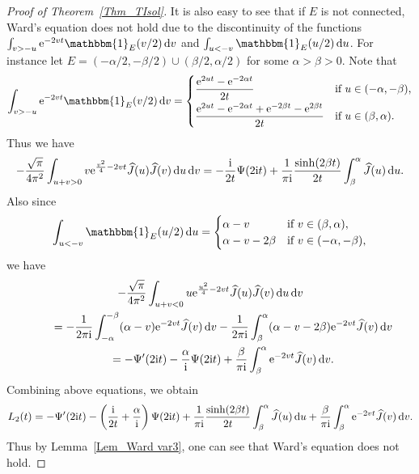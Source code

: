 \documentclass[pdftex]{sigma}
\numberwithin{equation}{section}
\newcommand{\1}{\chi}
\def\wh{\widehat}
\begin{document}
\begin{proof}[Proof of Theorem~\ref{Thm_TIsol}]
It is also easy to see that if $E$ is not connected, Ward's equation does not hold due to the discontinuity of the functions $\int_{ v>-u } {\rm e}^{-2vt } \mathbbm{1}_{E}(v/2) \,{\rm d}v$ and $\int_{u<-v} \mathbbm{1}_{E}(u/2)\,{\rm d}u$. For instance let $E=(-\alpha/2,-\beta/2) \cup (\beta/2,\alpha/2)$ for some $\alpha>\beta>0$.
	Note that
	\begin{gather*}
	\int_{ v>-u } {\rm e}^{-2vt } \mathbbm{1}_{E}(v/2) \,{\rm d}v=
	\begin{cases}
		\displaystyle \frac{{\rm e}^{2ut}-{\rm e}^{-2\alpha t}}{2t} &\text{if }u \in (-\alpha,-\beta),
		\vspace{1mm}\\
		\displaystyle \frac{{\rm e}^{2ut}-{\rm e}^{-2\alpha t}+{\rm e}^{-2\beta t}-{\rm e}^{2\beta t}}{2t} &\text{if }u \in (\beta,\alpha).
	\end{cases}
	\end{gather*}
	Thus we have
	\begin{gather*}
	-\frac{\sqrt{\pi}}{4\pi^2} \int_{ u+v>0 } v {\rm e}^{ \frac{v^2}{4}-2vt } \wh{J}(u) \wh{J}(v) \,{\rm d}u\,{\rm d}v= -\frac{{\rm i}}{2t} \Psi(2{\rm i}t)+ \frac{1}{\pi {\rm i}} \frac{\sinh(2\beta t)}{2t} \int_{\beta}^\alpha \wh{J}(u)\,{\rm d}u.
	\end{gather*}
	Also since
	\begin{gather*}
		\int_{u<-v} \mathbbm{1}_{E}(u/2)\,{\rm d}u=
	\begin{cases}
		\alpha-v &\text{if }v \in (\beta,\alpha),
		\\
		\alpha-v-2\beta 	&\text{if }v \in (-\alpha,-\beta),
	\end{cases}
	\end{gather*}
	we have
	\begin{gather*}
 -\frac{\sqrt{\pi}}{4\pi^2} \int_{ u+v<0 } u {\rm e}^{ \frac{u^2}{4}-2vt } \wh{J}(u) \wh{J}(v) \,{\rm d}u\,{\rm d}v
		\\
\qquad{} =-\frac{1}{2\pi {\rm i}} \int_{-\alpha}^{-\beta} (\alpha-v) {\rm e}^{-2vt} \wh{J}(v) \,{\rm d}v-\frac{1}{2\pi {\rm i}} \int_{\beta}^{\alpha} (\alpha-v-2\beta) {\rm e}^{-2vt} \wh{J}(v) \,{\rm d}v
		\\
\qquad{} = -\Psi'(2{\rm i}t)-\frac{\alpha}{{\rm i}} \Psi(2{\rm i}t)+ \frac{\beta}{\pi {\rm i}} \int_{\beta}^{\alpha} {\rm e}^{-2vt} \wh{J}(v) \,{\rm d}v.
	\end{gather*}
	Combining above equations, we obtain
	\begin{gather*}
		L_2(t) =-\Psi'(2{\rm i}t)-\left( \frac{{\rm i}}{2t}+\frac{\alpha}{{\rm i}} \right)\Psi(2{\rm i}t)
		+ \frac{1}{\pi {\rm i}} \frac{\sinh(2\beta t)}{2t} \int_{\beta}^\alpha \wh{J}(u)\,{\rm d}u+ \frac{\beta}{\pi {\rm i}} \int_{\beta}^{\alpha} {\rm e}^{-2vt} \wh{J}(v) \,{\rm d}v.
	\end{gather*}
	Thus by Lemma~\ref{Lem_Ward var3}, one can see that Ward's equation does not hold.
	

\end{proof}
\end{document}
